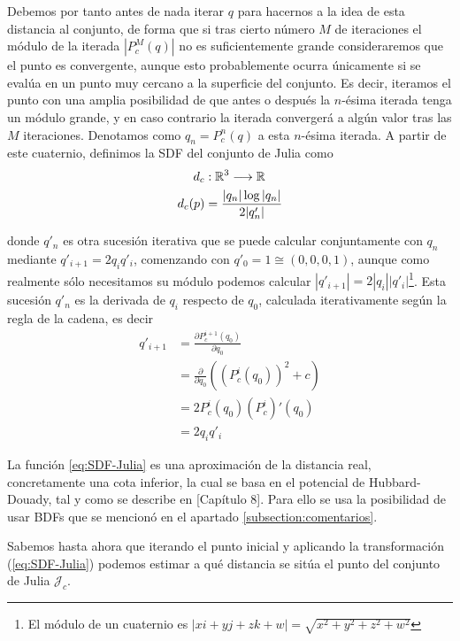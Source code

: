 Debemos por tanto antes de nada iterar $q$ para hacernos a la idea de esta distancia al conjunto, de forma que si tras cierto número $M$ de iteraciones el módulo de la iterada $|P_c^M(q)|$ no es suficientemente grande consideraremos que el punto es convergente, aunque esto probablemente ocurra únicamente si se evalúa en un punto muy cercano a la superficie del conjunto. Es decir, iteramos el punto con una amplia posibilidad de que antes o después la $n$-ésima iterada tenga un módulo grande, y en caso contrario la iterada convergerá a algún valor tras las $M$ iteraciones. Denotamos como $q_n=P_c^n(q)$ a esta $n$-ésima iterada. A partir de este cuaternio, definimos la SDF del conjunto de Julia como 
\begin{equation}
    \label{eq:SDF-Julia}
    \begin{split}
        d_c&:\mathbb{R}^3\longrightarrow\mathbb{R} \\
        d_c(p) &= \dfrac{|q_n|\log|q_n|}{2|q'_n|}
    \end{split}
\end{equation}

donde $q'_n$ es otra sucesión iterativa que se puede calcular conjuntamente con $q_n$ mediante $q'_{i+1}=2q_i q'_i$, comenzando con $q'_0=1\cong(0,0,0,1)$, aunque como realmente sólo necesitamos su módulo podemos calcular $|q'_{i+1}|=2|q_i||q'_i|$\footnote{El módulo de un cuaternio es $|xi+yj+zk+w|=\sqrt{x^2+y^2+z^2+w^2}$}. Esta sucesión $q'_n$ es la derivada de $q_i$ respecto de $q_0$, calculada iterativamente según la regla de la cadena, es decir
\begin{equation}
    \begin{split}
        q'_{i+1}&=\frac{\partial P^{i+1}_c(q_0)}{\partial q_0}\\
        &= \frac{\partial}{\partial q_0}\left((P_c^i(q_0))^2+c\right)\\
        &= 2 P_c^i(q_0)(P_c^i)'(q_0)\\
        &= 2 q_i q'_i
    \end{split}
\end{equation}

La función \ref{eq:SDF-Julia} es una aproximación de la distancia real, concretamente una cota inferior, la cual se basa en el potencial de Hubbard-Douady, tal y como se describe en \cite{Hubbard-Douady}[Capítulo 8]. Para ello se usa la posibilidad de usar BDFs que se mencionó en el apartado \ref{subsection:comentarios}.

Sabemos hasta ahora que iterando el punto inicial y aplicando la transformación (\ref{eq:SDF-Julia}) podemos estimar a qué distancia se sitúa el punto del conjunto de Julia $\mathcal{J}_c$. 

